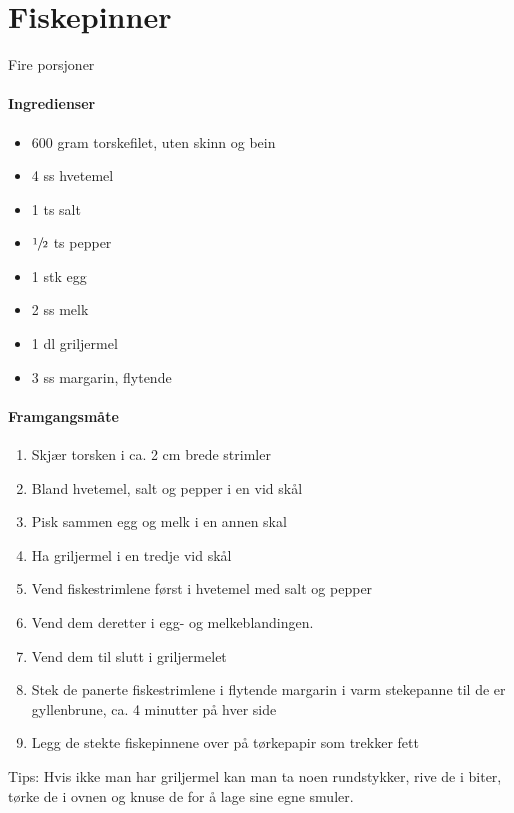 \section{﻿Fiskepinner}
Fire porsjoner

\paragraph{Ingredienser}
\begin{itemize}[noitemsep]
	\item 600 gram  torskefilet, uten skinn og bein
	\item 4 ss hvetemel
	\item 1 ts salt
	\item $\sfrac{1}{2}$  ts pepper
	\item 1 stk egg
	\item 2 ss melk
	\item 1 dl griljermel
	\item 3 ss margarin, flytende
\end{itemize}


\paragraph{Framgangsmåte}
\begin{enumerate}[noitemsep]
	\item Skjær torsken i ca. 2 cm brede strimler
	\item Bland hvetemel, salt og pepper i en vid skål
	\item Pisk sammen egg og melk i en annen skal
	\item Ha griljermel i en tredje vid skål
	\item Vend fiskestrimlene først i hvetemel med salt og pepper
	\item Vend dem deretter i egg- og melkeblandingen.
	\item Vend dem til slutt i griljermelet
	\item Stek de panerte fiskestrimlene i flytende margarin i varm stekepanne til de er gyllenbrune, ca. 4 minutter på hver side
	\item Legg de stekte fiskepinnene over på tørkepapir som trekker fett
\end{enumerate}

Tips: Hvis ikke man har griljermel kan man ta noen rundstykker, rive de i biter, tørke de i ovnen og knuse de for å lage sine egne smuler.
